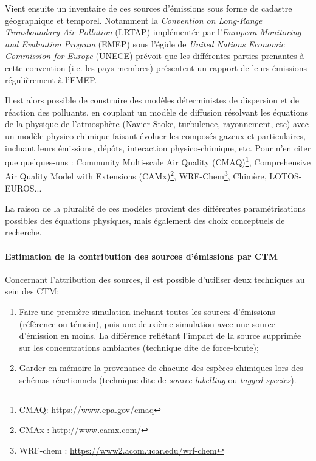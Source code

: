 Vient ensuite un inventaire de ces sources d'émissions sous forme de cadastre géographique
et temporel. Notamment la \textit{Convention on Long-Range Transboundary Air
Pollution} (LRTAP) implémentée par l'\textit{European Monitoring and Evaluation Program}
(EMEP) sous l'égide de \textit{United Nations Economic Commission for Europe} (UNECE)
prévoit que les différentes parties prenantes à cette convention (i.e. les pays membres)
présentent un rapport de leurs émissions régulièrement à l'EMEP.

Il est alors possible de construire des modèles déterministes de dispersion et de
réaction des polluants, en couplant un modèle de diffusion résolvant les équations de la
physique de l'atmosphère (Navier-Stoke, turbulence, rayonnement, etc) avec un modèle
physico-chimique faisant évoluer les composés gazeux et particulaires, incluant leurs
émissions, dépôts, interaction physico-chimique, etc. Pour n'en citer que quelques-uns : 
Community Multi-scale Air Quality (CMAQ)\footnote{CMAQ: \url{https://www.epa.gov/cmaq}},
Comprehensive Air Quality Model with Extensions (CAMx)\footnote{CMAx : \url{http://www.camx.com/}},
WRF-Chem\footnote{WRF-chem : \url{https://www2.acom.ucar.edu/wrf-chem}},
Chimère,
LOTOS-EUROS...

La raison de la pluralité de ces modèles provient des différentes paramétrisations
possibles des équations physiques, mais également des choix conceptuels de recherche.

\paragraph{Estimation de la contribution des sources d'émissions par CTM}%
\label{par:source_apportionment}

Concernant l'attribution des sources, il est possible d'utiliser deux techniques au sein
des CTM:

\begin{enumerate}
    \item Faire une première simulation incluant toutes les sources d'émissions (référence
        ou témoin), puis une deuxième simulation avec une source d'émission en moins. La
        différence reflétant l'impact de la source supprimée sur les concentrations
        ambiantes (technique dite de force-brute);
    \item Garder en mémoire la provenance de chacune des espèces chimiques lors des
        schémas réactionnels (technique dite de \textit{source labelling} ou \textit{tagged species}).
\end{enumerate}

